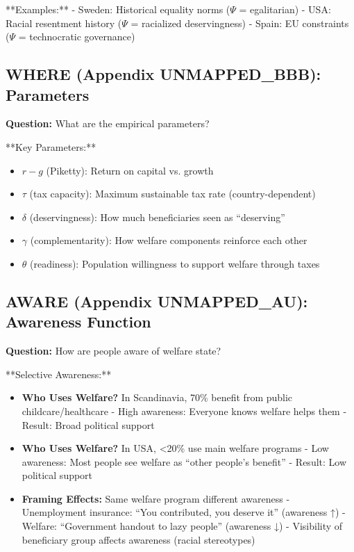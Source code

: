 **Examples:**
- Sweden: Historical equality norms ($\Psi$ = egalitarian)
- USA: Racial resentment history ($\Psi$ = racialized deservingness)
- Spain: EU constraints ($\Psi$ = technocratic governance)

\subsection{WHERE (Appendix UNMAPPED_BBB): Parameters}

\textbf{Question:} What are the empirical parameters?

**Key Parameters:**
\begin{itemize}
\item $r - g$ (Piketty): Return on capital vs. growth
\item $\tau$ (tax capacity): Maximum sustainable tax rate (country-dependent)
\item $\delta$ (deservingness): How much beneficiaries seen as ``deserving''
\item $\gamma$ (complementarity): How welfare components reinforce each other
\item $\theta$ (readiness): Population willingness to support welfare through taxes
\end{itemize}

\subsection{AWARE (Appendix UNMAPPED_AU): Awareness Function}

\textbf{Question:} How are people aware of welfare state?

**Selective Awareness:**
\begin{itemize}
\item \textbf{Who Uses Welfare?} In Scandinavia, 70\% benefit from public childcare/healthcare
- High awareness: Everyone knows welfare helps them
- Result: Broad political support

\item \textbf{Who Uses Welfare?} In USA, <20\% use main welfare programs
- Low awareness: Most people see welfare as ``other people's benefit''
- Result: Low political support

\item \textbf{Framing Effects:} Same welfare program different awareness
- Unemployment insurance: ``You contributed, you deserve it'' (awareness ↑)
- Welfare: ``Government handout to lazy people'' (awareness ↓)
- Visibility of beneficiary group affects awareness (racial stereotypes)
\end{itemize}

